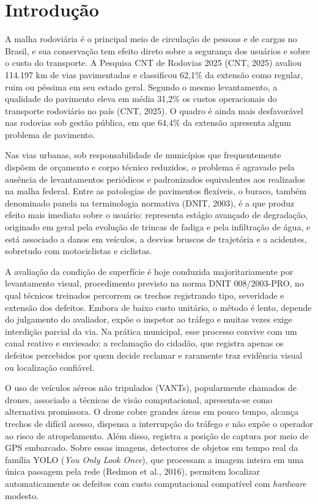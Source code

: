 \documentclass[12pt]{article}
\begin{document}
\section{Introdução}
\label{sec:introducao}

A malha rodoviária é o principal meio de circulação de pessoas e de
cargas no Brasil, e sua conservação tem efeito direto sobre a segurança
dos usuários e sobre o custo do transporte. A Pesquisa CNT de Rodovias
2025 (CNT, 2025) avaliou 114.197 km de vias pavimentadas e classificou 62,1\% da
extensão como regular, ruim ou péssima em seu estado geral. Segundo o
mesmo levantamento, a qualidade do pavimento eleva em média 31,2\% os
custos operacionais do transporte rodoviário no país (CNT, 2025). O
quadro é ainda mais desfavorável nas rodovias sob gestão pública, em que
64,4\% da extensão apresenta algum problema de pavimento.

Nas vias urbanas, sob responsabilidade de municípios que frequentemente
dispõem de orçamento e corpo técnico reduzidos, o problema é agravado
pela ausência de levantamentos periódicos e padronizados equivalentes aos
realizados na malha federal. Entre as patologias de pavimentos flexíveis,
o buraco, também denominado panela na terminologia normativa (DNIT,
2003), é a que produz efeito mais imediato sobre o usuário: representa
estágio avançado de degradação, originado em geral pela evolução de
trincas de fadiga e pela infiltração de água, e está associado a danos em
veículos, a desvios bruscos de trajetória e a acidentes, sobretudo com
motociclistas e ciclistas.

A avaliação da condição de superfície é hoje conduzida majoritariamente
por levantamento visual, procedimento previsto na norma DNIT
008/2003-PRO, no qual técnicos treinados percorrem os trechos registrando
tipo, severidade e extensão dos defeitos. Embora de baixo custo unitário,
o método é lento, depende do julgamento do avaliador, expõe o inspetor ao
tráfego e muitas vezes exige interdição parcial da via. Na prática
municipal, esse processo convive com um canal reativo e enviesado: a
reclamação do cidadão, que registra apenas os defeitos percebidos por
quem decide reclamar e raramente traz evidência visual ou localização
confiável.

O uso de veículos aéreos não tripulados (VANTs), popularmente chamados de
drones, associado a técnicas de visão computacional, apresenta-se como
alternativa promissora. O drone cobre grandes áreas em pouco tempo,
alcança trechos de difícil acesso, dispensa a interrupção do tráfego e
não expõe o operador ao risco de atropelamento. Além disso, registra a
posição de captura por meio de GPS embarcado. Sobre essas imagens,
detectores de objetos em tempo real da família YOLO (\emph{You Only Look
Once}), que processam a imagem inteira em uma única passagem pela rede
(Redmon et al., 2016), permitem localizar automaticamente os defeitos com
custo computacional compatível com \emph{hardware} modesto.
\end{document}
